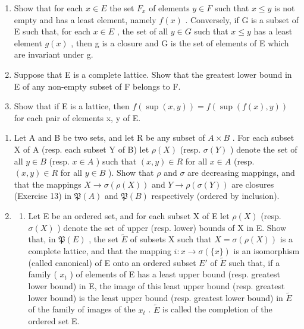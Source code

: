 \begin{enumerate}
\def\labelenumi{(\alph{enumi})}
\item
  Show that for each \(x \in E\) the set \(F_{x}\) of elements \(y \in F\) such that \(x \leqslant y\) is not empty and has a least element, namely \(f(x)\) . Conversely, if G is a subset of E such that, for each \(x \in E\) , the set of all \(y \in G\) such that \(x \leqslant y\) has a least element \(g(x)\) , then g is a closure and G is the set of elements of E which are invariant under g.
\item
  Suppose that E is a complete lattice. Show that the greatest lower bound in E of any non-empty subset of F belongs to F.
\item
  Show that if E is a lattice, then \(f(\sup(x,y)) = f(\sup(f(x),y))\) for each pair of elements x, y of E.
\end{enumerate}

\begin{enumerate}
\def\labelenumi{\arabic{enumi}.}
\setcounter{enumi}{13}
\item
  Let A and B be two sets, and let R be any subset of \(A \times B\) . For each subset X of A (resp. each subset Y of B) let \(\rho(X)\) (resp. \(\sigma(Y)\) ) denote the set of all \(y \in B\) (resp. \(x \in A\) ) such that \((x, y) \in R\) for all \(x \in A\) (resp. \((x, y) \in R\) for all \(y \in B\) ). Show that \(\rho\) and \(\sigma\) are decreasing mappings, and that the mappings \(X \to \sigma(\rho(X))\) and \(Y \to \rho(\sigma(Y))\) are closures (Exercise 13) in \(\mathfrak{P}(A)\) and \(\mathfrak{P}(B)\) respectively (ordered by inclusion).
\item
  \begin{enumerate}
  \def\labelenumii{(\alph{enumii})}
  \tightlist
  \item
    Let E be an ordered set, and for each subset X of E let \(\rho(X)\) (resp. \(\sigma(X)\) ) denote the set of upper (resp. lower) bounds of X in E. Show that, in \(\mathfrak{P}(E)\) , the set \(\tilde{E}\) of subsets X such that \(X = \sigma(\rho(X))\) is a complete lattice, and that the mapping \(i: x \to \sigma(\{x\})\) is an isomorphism (called canonical) of E onto an ordered subset \(E'\) of \(\tilde{E}\) such that, if a family ( \(x_t\) ) of elements of E has a least upper bound (resp. greatest lower bound) in E, the image of this least upper bound (resp. greatest lower bound) is the least upper bound (resp. greatest lower bound) in \(\tilde{E}\) of the family of images of the \(x_t\) . \(\tilde{E}\) is called the completion of the ordered set E.
  \end{enumerate}
\end{enumerate}

